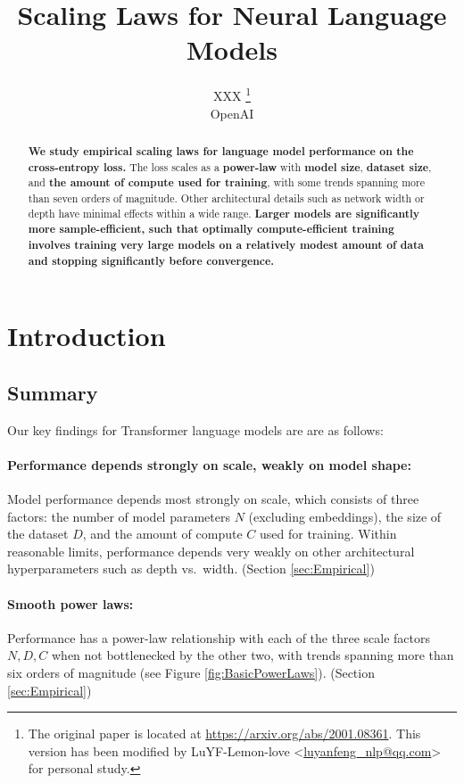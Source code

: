 \documentclass[english]{article}
\title{Scaling Laws for Neural Language Models}
\author{
    XXX \thanks{The original paper is located at \url{https://arxiv.org/abs/2001.08361}. This version has been modified by LuYF-Lemon-love <\url{luyanfeng_nlp@qq.com}> for personal study.}\\
    OpenAI
}
\begin{document}
\maketitle

\begin{abstract}
\textbf{We study empirical scaling laws for language model performance on the cross-entropy loss.}
The loss scales as a \textbf{power-law} with \textbf{model size}, \textbf{dataset size}, and \textbf{the amount of compute used for training}, with some trends spanning more than seven orders of magnitude.
Other architectural details such as network width or depth have minimal effects within a wide range.
\textbf{Larger models are significantly more sample-efficient, such that optimally compute-efficient training involves training very large models on a relatively modest amount of data and stopping significantly before convergence.}

\end{abstract}

\tableofcontents{}

\section{Introduction}

\subsection{Summary}

Our key findings for Transformer language models are are as follows:

\paragraph{Performance depends strongly on scale, weakly on model shape:} Model performance depends most strongly on scale, which consists of three factors: the number of model parameters $N$ (excluding embeddings), the size of the dataset $D$, and the amount of compute $C$ used for training.  Within reasonable limits, performance depends very weakly on other architectural hyperparameters such as depth vs.~width. (Section \ref{sec:Empirical})

\paragraph{Smooth power laws:} Performance has a power-law relationship with each of the three scale factors $N, D, C$ when not bottlenecked by the other two, with trends spanning more than six orders of magnitude (see Figure \ref{fig:BasicPowerLaws}). (Section \ref{sec:Empirical})
\end{document}
